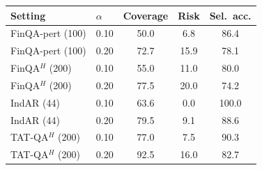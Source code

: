 \begin{tabular}{llccc}
\toprule
Setting & $\alpha$ & Coverage & Risk & Sel.\ acc. \\
\midrule
FinQA-pert (100) & 0.10 & 50.0 & 6.8 & 86.4 \\
FinQA-pert (100) & 0.20 & 72.7 & 15.9 & 78.1 \\
FinQA$^{H}$ (200) & 0.10 & 55.0 & 11.0 & 80.0 \\
FinQA$^{H}$ (200) & 0.20 & 77.5 & 20.0 & 74.2 \\
IndAR (44) & 0.10 & 63.6 & 0.0 & 100.0 \\
IndAR (44) & 0.20 & 79.5 & 9.1 & 88.6 \\
TAT-QA$^{H}$ (200) & 0.10 & 77.0 & 7.5 & 90.3 \\
TAT-QA$^{H}$ (200) & 0.20 & 92.5 & 16.0 & 82.7 \\
\bottomrule
\end{tabular}
